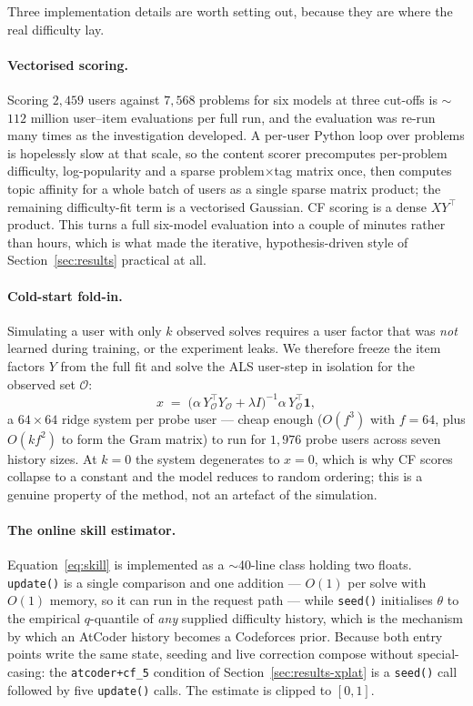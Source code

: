 \documentclass[12pt,a4paper]{article}
\begin{document}
Three implementation details are worth setting out, because they are where the real
difficulty lay.

\paragraph{Vectorised scoring.} Scoring $2{,}459$ users against $7{,}568$ problems for six
models at three cut-offs is $\sim$$112$ million user--item evaluations per full run, and
the evaluation was re-run many times as the investigation developed. A per-user Python
loop over problems is hopelessly slow at that scale, so the content scorer precomputes
per-problem difficulty, log-popularity and a sparse problem$\times$tag matrix once, then
computes topic affinity for a whole batch of users as a single sparse matrix product;
the remaining difficulty-fit term is a vectorised Gaussian. CF scoring is a dense
$X Y^{\top}$ product. This turns a full six-model evaluation into a couple of minutes
rather than hours, which is what made the iterative, hypothesis-driven style of
Section~\ref{sec:results} practical at all.

\paragraph{Cold-start fold-in.} Simulating a user with only $k$ observed solves requires
a user factor that was \emph{not} learned during training, or the experiment leaks. We
therefore freeze the item factors $Y$ from the full fit and solve the ALS user-step in
isolation for the observed set $\mathcal{O}$:
\[
x \;=\; \big(\alpha\,Y_{\mathcal{O}}^{\top} Y_{\mathcal{O}} + \lambda I\big)^{-1}
        \alpha\,Y_{\mathcal{O}}^{\top}\mathbf{1},
\]
a $64\times64$ ridge system per probe user --- cheap enough ($O(f^3)$ with $f=64$, plus
$O(kf^2)$ to form the Gram matrix) to run for $1{,}976$ probe users across seven history
sizes. At $k=0$ the system degenerates to $x=0$, which is why CF scores collapse to a
constant and the model reduces to random ordering; this is a genuine property of the
method, not an artefact of the simulation.

\paragraph{The online skill estimator.} Equation~\ref{eq:skill} is implemented as a
$\sim$40-line class holding two floats. \texttt{update()} is a single comparison and one
addition --- $O(1)$ per solve with $O(1)$ memory, so it can run in the request path --- while
\texttt{seed()} initialises $\theta$ to the empirical $q$-quantile of \emph{any} supplied
difficulty history, which is the mechanism by which an AtCoder history becomes a
Codeforces prior. Because both entry points write the same state, seeding and live correction compose
without special-casing: the \texttt{atcoder+cf\_5} condition of
Section~\ref{sec:results-xplat} is a \texttt{seed()} call followed by five
\texttt{update()} calls. The estimate is clipped to $[0,1]$.
\end{document}
